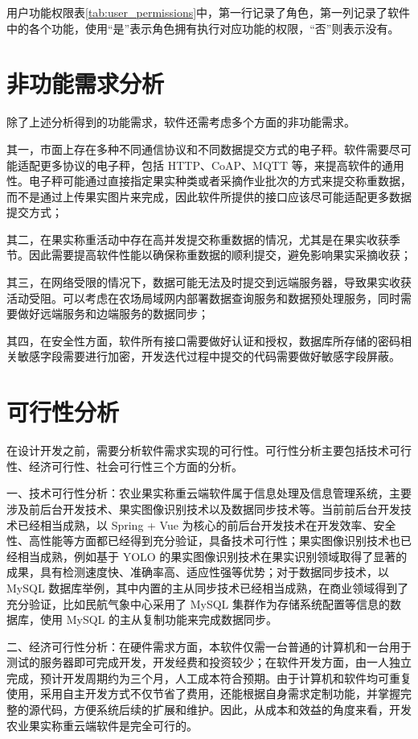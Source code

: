 用户功能权限表\ref{tab:user_permissions}中，第一行记录了角色，第一列记录了软件中的各个功能，使用“是”表示角色拥有执行对应功能的权限，“否”则表示没有。

\section{非功能需求分析}\label{sec:req2}

除了上述分析得到的功能需求，软件还需考虑多个方面的非功能需求。

其一，市面上存在多种不同通信协议和不同数据提交方式的电子秤。软件需要尽可能适配更多协议的电子秤，包括 HTTP、CoAP、MQTT 等，来提高软件的通用性。电子秤可能通过直接指定果实种类或者采摘作业批次的方式来提交称重数据，而不是通过上传果实图片来完成，因此软件所提供的接口应该尽可能适配更多数据提交方式；

其二，在果实称重活动中存在高并发提交称重数据的情况，尤其是在果实收获季节。因此需要提高软件性能以确保称重数据的顺利提交，避免影响果实采摘收获；

其三，在网络受限的情况下，数据可能无法及时提交到远端服务器，导致果实收获活动受阻。可以考虑在农场局域网内部署数据查询服务和数据预处理服务，同时需要做好远端服务和边端服务的数据同步；

其四，在安全性方面，软件所有接口需要做好认证和授权，数据库所存储的密码相关敏感字段需要进行加密，开发迭代过程中提交的代码需要做好敏感字段屏蔽。

\section{可行性分析}\label{sec:req3}

在设计开发之前，需要分析软件需求实现的可行性。可行性分析主要包括技术可行性、经济可行性、社会可行性三个方面的分析\cite{叶俊民2006软件工程}。

一、技术可行性分析：农业果实称重云端软件属于信息处理及信息管理系统，主要涉及前后台开发技术、果实图像识别技术以及数据同步技术等。当前前后台开发技术已经相当成熟，以 Spring + Vue 为核心的前后台开发技术在开发效率、安全性、高性能等方面都已经得到充分验证\cite{Qiu2021}\cite{Shan2021}，具备技术可行性；果实图像识别技术也已经相当成熟，例如基于 YOLO 的果实图像识别技术在果实识别领域取得了显著的成果，具有检测速度快、准确率高、适应性强等优势\cite{Lin2019}；对于数据同步技术，以 MySQL 数据库举例，其中内置的主从同步技术已经相当成熟，在商业领域得到了充分验证，比如民航气象中心采用了 MySQL 集群作为存储系统配置等信息的数据库，使用 MySQL 的主从复制功能来完成数据同步\cite{厍雯轩-2024}。

二、经济可行性分析：在硬件需求方面，本软件仅需一台普通的计算机和一台用于测试的服务器即可完成开发，开发经费和投资较少；在软件开发方面，由一人独立完成，预计开发周期约为三个月，人工成本符合预期。由于计算机和软件均可重复使用，采用自主开发方式不仅节省了费用，还能根据自身需求定制功能，并掌握完整的源代码，方便系统后续的扩展和维护。因此，从成本和效益的角度来看，开发农业果实称重云端软件是完全可行的。

